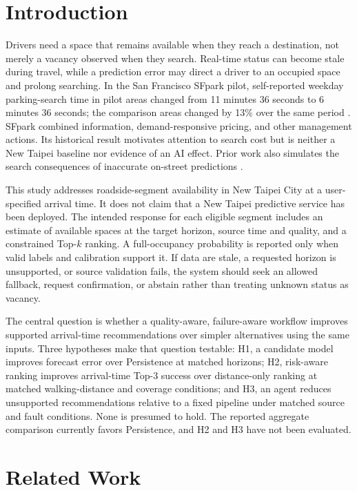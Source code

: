 \documentclass[conference,letterpaper,10pt]{IEEEtran}
\begin{document}
\section{Introduction}
Drivers need a space that remains available when they reach a destination, not merely a vacancy observed when they search. Real-time status can become stale during travel, while a prediction error may direct a driver to an occupied space and prolong searching. In the San Francisco SFpark pilot, self-reported weekday parking-search time in pilot areas changed from 11 minutes 36 seconds to 6 minutes 36 seconds; the comparison areas changed by 13\% over the same period \cite{sfmta2014}. SFpark combined information, demand-responsive pricing, and other management actions. Its historical result motivates attention to search cost but is neither a New Taipei baseline nor evidence of an AI effect. Prior work also simulates the search consequences of inaccurate on-street predictions \cite{cao2025}.

This study addresses roadside-segment availability in New Taipei City at a user-specified arrival time. It does not claim that a New Taipei predictive service has been deployed. The intended response for each eligible segment includes an estimate of available spaces at the target horizon, source time and quality, and a constrained Top-$k$ ranking. A full-occupancy probability is reported only when valid labels and calibration support it. If data are stale, a requested horizon is unsupported, or source validation fails, the system should seek an allowed fallback, request confirmation, or abstain rather than treating unknown status as vacancy.

The central question is whether a quality-aware, failure-aware workflow improves supported arrival-time recommendations over simpler alternatives using the same inputs. Three hypotheses make that question testable: H1, a candidate model improves forecast error over Persistence at matched horizons; H2, risk-aware ranking improves arrival-time Top-3 success over distance-only ranking at matched walking-distance and coverage conditions; and H3, an agent reduces unsupported recommendations relative to a fixed pipeline under matched source and fault conditions. None is presumed to hold. The reported aggregate comparison currently favors Persistence, and H2 and H3 have not been evaluated.

\section{Related Work}
\end{document}
